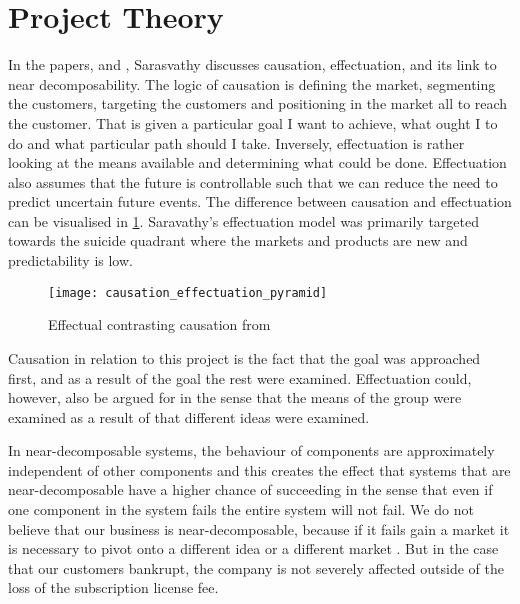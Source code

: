 \section{Project Theory}
In the papers, \citet{Sarasvathy2003203} and \citet{sarasvathy2001causation}, Sarasvathy discusses causation, effectuation, and its link to near decomposability.
The logic of causation is defining the market, segmenting the customers, targeting the customers and positioning in the market all to reach the customer. 
That is given a particular goal I want to achieve, what ought I to do and what particular path should I take.
Inversely, effectuation is rather looking at the means available and determining what could be done.
Effectuation also assumes that the future is controllable such that we can reduce the need to predict uncertain future events.
The difference between causation and effectuation can be visualised in \cref{fig:causation_effectuation}.
Saravathy's effectuation model was primarily targeted towards the suicide quadrant where the markets and products are new and predictability is low.

\begin{figure}
	\centering
	\texttt{[image: causation\_effectuation\_pyramid]}
	\caption{Effectual contrasting causation from \citet{Sarasvathy2003203}}
	\label{fig:causation_effectuation}
\end{figure}

Causation in relation to this project is the fact that the goal was approached first, and as a result of the goal the rest were examined. 
Effectuation could, however, also be argued for in the sense that the means of the group were examined as a result of that different ideas were examined.
                                                                                                              
In near-decomposable systems, the behaviour of components are approximately independent of other components and this creates the effect that systems that are near-decomposable have a higher chance of succeeding in the sense that even if one component in the system fails the entire system will not fail.
We do not believe that our business is near-decomposable, because if it fails gain a market it is necessary to pivot onto a different idea or a different market \citep[pg. 149-178]{ries2011lean}.
But in the case that our customers bankrupt, the company is not severely affected outside of the loss of the subscription license fee. 


